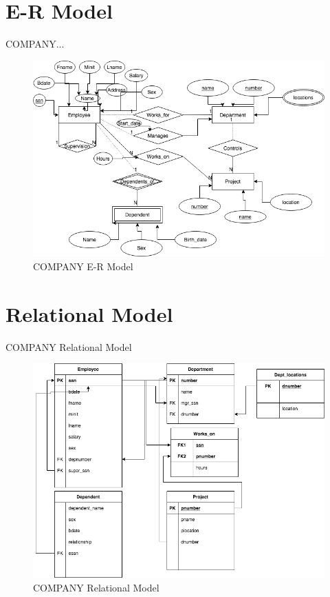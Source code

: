 \documentclass[10pt]{article}         %
\begin{document}
\section{E-R Model}

COMPANY...

\begin{figure}[h]
     \includegraphics[scale=0.2]{er_company}
     \caption{COMPANY E-R Model}
\end{figure}
   
\section{Relational Model}
COMPANY Relational Model

\begin{figure}[h]
     \includegraphics[scale=0.2]{relational_company}
     \caption{COMPANY Relational Model}
\end{figure}
\end{document}
